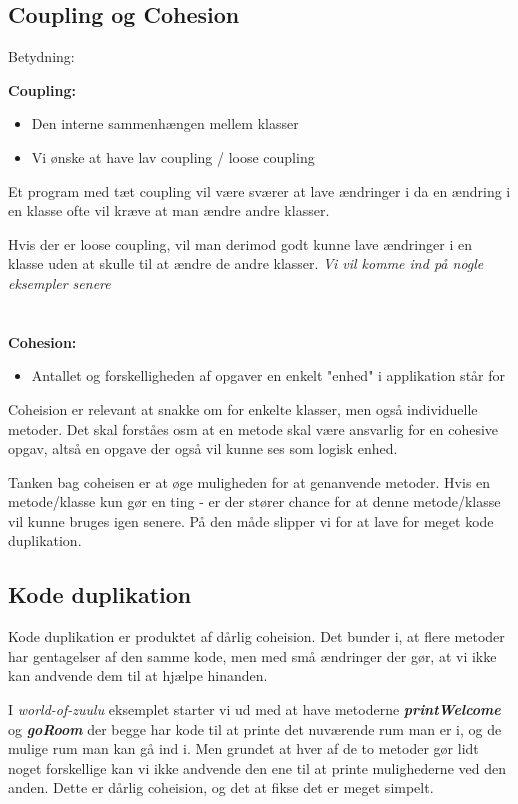 \documentclass{article}
\begin{document}
\subsection*{Coupling og Cohesion}
Betydning:
\begin{multicols}{2}
\textbf{\large Coupling:}
\begin{itemize}
	\item Den interne sammenhængen mellem klasser 
	\item Vi ønske at have lav coupling / loose coupling
\end{itemize} 
Et program med tæt coupling vil være sværer at lave ændringer i da en ændring i en klasse ofte vil kræve at man ændre andre klasser.

Hvis der er loose coupling, vil man derimod godt kunne lave ændringer i en klasse uden at skulle til at ændre de andre klasser. 
\textit{Vi vil komme ind på nogle eksempler senere} \\ \\ \\

\textbf{\large Cohesion:}
\begin{itemize}
	\item Antallet og forskelligheden af opgaver en enkelt "enhed" i applikation står for
\end{itemize}
Coheision er relevant at snakke om for enkelte klasser, men også individuelle metoder. 
Det skal forståes osm at en metode skal være ansvarlig for en cohesive opgav, altså en opgave der også vil kunne ses som logisk enhed.

Tanken bag coheisen er at øge muligheden for at genanvende metoder. Hvis en metode/klasse kun gør en ting - er der stører chance for at denne metode/klasse vil kunne bruges igen senere. På den måde slipper vi for at lave for meget kode duplikation.
\end{multicols}

\subsection*{Kode duplikation}
Kode duplikation er produktet af dårlig coheision. Det bunder i, at flere metoder har gentagelser af den samme kode, men med små ændringer der gør, at vi ikke kan andvende dem til at hjælpe hinanden. 

I \textit{world-of-zuulu} eksemplet starter vi ud med at have metoderne \textit{\textbf{printWelcome}} og \textit{\textbf{goRoom}} der begge har kode til at printe det nuværende rum man er i, og de mulige rum man kan gå ind i.
Men grundet at hver af de to metoder gør lidt noget forskellige kan vi ikke andvende den ene til at printe mulighederne ved den anden. Dette er dårlig coheision, og det at fikse det er meget simpelt.
\end{document}
